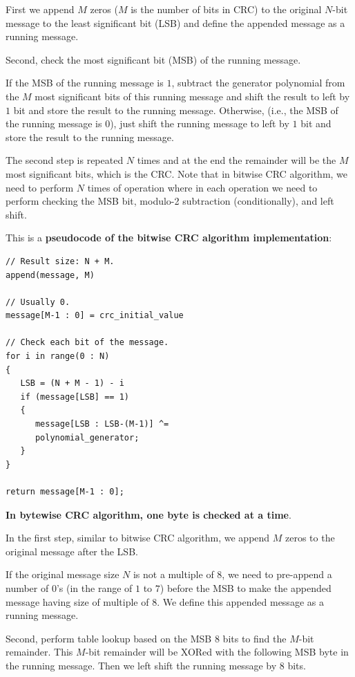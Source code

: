 \documentclass[fleqn]{IEEEtran}
\begin{document}
First we append $M$ zeros ($M$ is the number of bits in CRC) to the original 
$N$-bit message to the least significant bit (LSB) and define the appended 
message as a running message. 

Second, check the most significant bit (MSB) of the running message. 

If the MSB of the running message is $1$, subtract the generator polynomial 
from the $M$ most significant bits of this running message and shift the result 
to left by $1$ bit and store the result to the running message. 
Otherwise, (i.e., the MSB of the running message is $0$), just shift the running 
message to left by $1$ bit and store the result to the running message. 

The second step is repeated $N$ times and at the end the remainder will be the 
$M$ most significant bits, which is the CRC. Note that in bitwise CRC
algorithm, we need to perform $N$ times of operation where in each operation 
we need to perform checking the MSB bit, modulo-2 subtraction 
(conditionally), and left shift.

This is a \textbf{pseudocode of the bitwise CRC algorithm implementation}:
\begin{verbatim}
// Result size: N + M.
append(message, M)

// Usually 0.
message[M-1 : 0] = crc_initial_value

// Check each bit of the message.
for i in range(0 : N) 
{
   LSB = (N + M - 1) - i
   if (message[LSB] == 1)
   {
      message[LSB : LSB-(M-1)] ^= 
      polynomial_generator;
   }
}

return message[M-1 : 0];
\end{verbatim}

\textbf{In bytewise CRC algorithm, one byte is checked at a time}. 

In the first step, similar to bitwise CRC algorithm, we append $M$ zeros to 
the original message after the LSB. 

If the original message size $N$ is not a multiple of $8$, we need to pre-append 
a number of $0$’s (in the range of $1$ to $7$) before the MSB to make the 
appended message having size of multiple of $8$. We define this appended 
message as a running message. 

Second, perform table lookup based on the MSB $8$ bits to find the $M$-bit 
remainder. This $M$-bit remainder will be XORed with the following MSB 
byte in the running message. Then we left shift the running message by $8$ bits.
\end{document}
